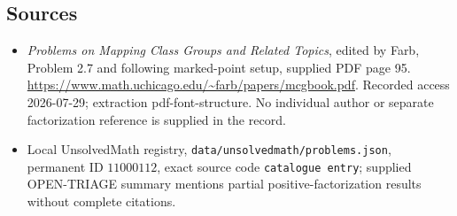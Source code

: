 \documentclass[11pt]{article}
\begin{document}
\subsection{Sources}
\begin{itemize}
\item \emph{Problems on Mapping Class Groups and Related Topics}, edited by Farb, Problem 2.7 and following marked-point setup, supplied PDF page 95. \url{https://www.math.uchicago.edu/~farb/papers/mcgbook.pdf}. Recorded access 2026-07-29; extraction pdf-font-structure. No individual author or separate factorization reference is supplied in the record.
\item Local UnsolvedMath registry, \texttt{data/unsolvedmath/problems.json}, permanent ID \(11000112\), exact source code \texttt{catalogue entry}; supplied OPEN-TRIAGE summary mentions partial positive-factorization results without complete citations.
\end{itemize}
\end{document}
